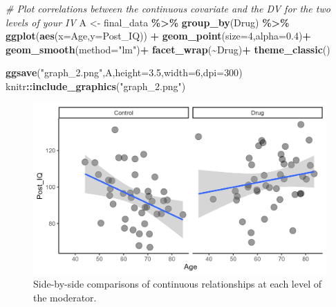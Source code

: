 \documentclass[
]{book}
\newenvironment{Shaded}{\begin{snugshade}}{\end{snugshade}}
\newcommand{\AttributeTok}[1]{\textcolor[rgb]{0.13,0.29,0.53}{#1}}
\newcommand{\CommentTok}[1]{\textcolor[rgb]{0.56,0.35,0.01}{\textit{#1}}}
\newcommand{\DecValTok}[1]{\textcolor[rgb]{0.00,0.00,0.81}{#1}}
\newcommand{\FloatTok}[1]{\textcolor[rgb]{0.00,0.00,0.81}{#1}}
\newcommand{\FunctionTok}[1]{\textcolor[rgb]{0.13,0.29,0.53}{\textbf{#1}}}
\newcommand{\NormalTok}[1]{#1}
\newcommand{\OtherTok}[1]{\textcolor[rgb]{0.56,0.35,0.01}{#1}}
\newcommand{\SpecialCharTok}[1]{\textcolor[rgb]{0.81,0.36,0.00}{\textbf{#1}}}
\newcommand{\StringTok}[1]{\textcolor[rgb]{0.31,0.60,0.02}{#1}}
\begin{document}
\begin{Shaded}
\begin{Highlighting}[]
\CommentTok{\# Plot correlations between the continuous covariate and the DV for the two levels of your IV}
\NormalTok{A }\OtherTok{\textless{}{-}}\NormalTok{ final\_data }\SpecialCharTok{\%\textgreater{}\%}
  \FunctionTok{group\_by}\NormalTok{(Drug) }\SpecialCharTok{\%\textgreater{}\%}
  \FunctionTok{ggplot}\NormalTok{(}\FunctionTok{aes}\NormalTok{(}\AttributeTok{x=}\NormalTok{Age,}\AttributeTok{y=}\NormalTok{Post\_IQ)) }\SpecialCharTok{+}
  \FunctionTok{geom\_point}\NormalTok{(}\AttributeTok{size=}\DecValTok{4}\NormalTok{,}\AttributeTok{alpha=}\FloatTok{0.4}\NormalTok{)}\SpecialCharTok{+}
  \FunctionTok{geom\_smooth}\NormalTok{(}\AttributeTok{method=}\StringTok{"lm"}\NormalTok{)}\SpecialCharTok{+}
  \FunctionTok{facet\_wrap}\NormalTok{(}\SpecialCharTok{\textasciitilde{}}\NormalTok{Drug)}\SpecialCharTok{+}
  \FunctionTok{theme\_classic}\NormalTok{()}

\FunctionTok{ggsave}\NormalTok{(}\StringTok{"graph\_2.png"}\NormalTok{,A,}\AttributeTok{height=}\FloatTok{3.5}\NormalTok{,}\AttributeTok{width=}\DecValTok{6}\NormalTok{,}\AttributeTok{dpi=}\DecValTok{300}\NormalTok{)}
\NormalTok{knitr}\SpecialCharTok{::}\FunctionTok{include\_graphics}\NormalTok{(}\StringTok{"graph\_2.png"}\NormalTok{)}
\end{Highlighting}
\end{Shaded}

\begin{figure}
\includegraphics[width=25in]{graph_2} \caption{Side-by-side comparisons of continuous relationships at each level of the moderator.}\label{fig:unnamed-chunk-33}
\end{figure}
\end{document}
